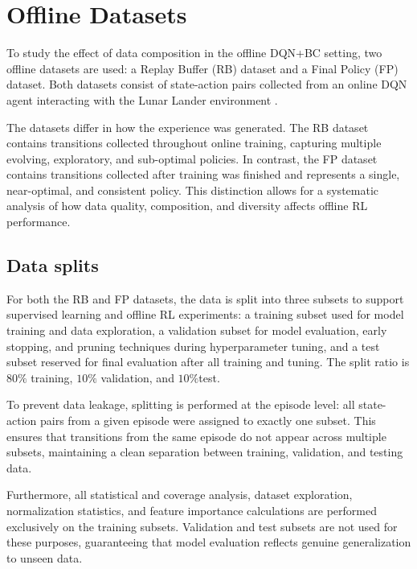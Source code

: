 \section{Offline Datasets}
\label{sec:the_learning_pipeline}
To study the effect of data composition in the offline DQN+BC setting, two offline datasets are used: a Replay Buffer (RB) dataset and a Final Policy (FP) dataset. Both datasets consist of state-action pairs collected from an online DQN agent \cite{DQN} interacting with the Lunar Lander environment \cite{LunarLanderEnv}.


The datasets differ in how the experience was generated. The RB dataset contains transitions collected throughout online training, capturing multiple evolving, exploratory, and sub-optimal policies. In contrast, the FP dataset contains transitions collected after training was finished and represents a single, near-optimal, and consistent policy. This distinction allows for a systematic analysis of how data quality, composition, and diversity affects offline RL performance.




\subsection{Data splits}
For both the RB and FP datasets, the data is split into three subsets to support supervised learning and offline RL experiments: a training subset used for model training and data exploration, a validation subset for model evaluation, early stopping, and pruning techniques during hyperparameter tuning, and a test subset reserved for final evaluation after all training and tuning. The split ratio is $80\%$ training, $10\%$ validation, and $10\% $test.

To prevent data leakage, splitting is performed at the episode level: all state-action pairs from a given episode were assigned to exactly one subset. This ensures that transitions from the same episode do not appear across multiple subsets, maintaining a clean separation between training, validation, and testing data.

Furthermore, all statistical and coverage analysis, dataset exploration, normalization statistics, and feature importance calculations are performed exclusively on the training subsets. Validation and test subsets are not used for these purposes, guaranteeing that model evaluation reflects genuine generalization to unseen data.





